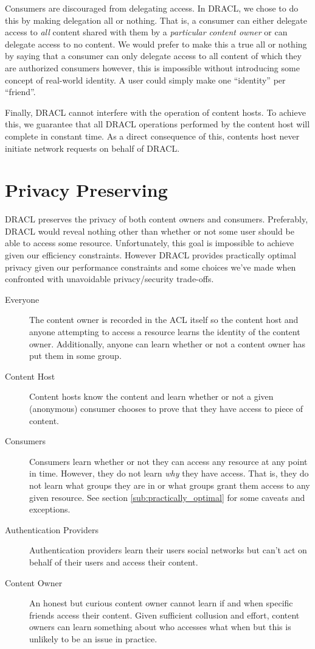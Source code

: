 \documentclass[pdftex,12pt,a4papaer]{report}
\begin{document}
Consumers are discouraged from delegating access. In DRACL, we chose to do this
by making delegation all or nothing. That is, a consumer can either delegate
access to \emph{all} content shared with them by a \emph{particular content
owner} or can delegate access to no content. We would prefer to make this a true
all or nothing by saying that a consumer can only delegate access to all content
of which they are authorized consumers however, this is impossible without
introducing some concept of real-world identity. A user could simply make one
``identity'' per ``friend''. 

Finally, DRACL cannot interfere with the operation of content hosts. To achieve
this, we guarantee that all DRACL operations performed by the content host will
complete in constant time. As a direct consequence of this, contents host never
initiate network requests on behalf of DRACL\@.

\section{Privacy Preserving}
\label{sec:privacy}

DRACL preserves the privacy of both content owners and consumers. Preferably,
DRACL would reveal nothing other than whether or not some user should be able to
access some resource. Unfortunately, this goal is impossible to achieve given
our efficiency constraints. However DRACL provides practically optimal privacy
given our performance constraints and some choices we've made when confronted
with unavoidable privacy/security trade-offs.

\begin{description}
\item[Everyone] The content owner is recorded in the ACL itself so the content
  host and anyone attempting to access a resource learns the identity of the
  content owner. Additionally, anyone can learn whether or not a content owner
  has put them in some group.
\item[Content Host] Content hosts know the content and learn whether or not a
  given (anonymous) consumer chooses to prove that they have access to piece of
  content.
\item[Consumers] Consumers learn whether or not they can access any resource at
  any point in time. However, they do not learn \emph{why} they have access.
  That is, they do not learn what groups they are in or what groups grant them
  access to any given resource. See section \ref{sub:practically_optimal} for some
  caveats and exceptions.
\item[Authentication Providers] Authentication providers learn their users
  social networks but can't act on behalf of their users and access their
  content.
\item[Content Owner] An honest but curious content owner cannot learn if and
  when specific friends access their content. Given sufficient collusion and
  effort, content owners can learn something about who accesses what when but
  this is unlikely to be an issue in practice.
\end{description}
\end{document}
